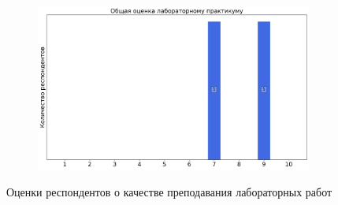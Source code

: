 \begin{figure}[H]
\begin{subfigure}[b]{0.45\textwidth}
			\end{subfigure}
			\begin{subfigure}[b]{0.45\textwidth}
				\centering
				\includegraphics[width=\textwidth]{images/3 course/Радиофизическая лаборатория/labniks-marks-Манукян В.К.-3.png}
			\end{subfigure}	
			\caption{Оценки респондентов о качестве преподавания лабораторных работ}
		\end{figure}

